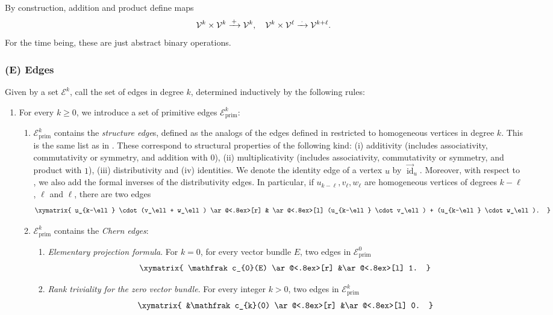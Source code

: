 \documentclass[JEP,XML,SOM,Unicode,published]{cedram}
\newcommand\To[1]{\mathchoice{\xrightarrow{\kern1pt#1\kern1pt}}{\stackrel{#1}{\longrightarrow}}{}{}}
\theoremstyle{plain}
\theoremstyle{definition}
\newcommand{\Ecal}{\mathcal E}
\newcommand{\Vcal}{\mathcal V}
\newcommand{\cfrak}{\mathfrak c}
\newcommand{\prim}{\mathrm{prim}}
\DeclareMathOperator{\id}{id}
\begin{document}
By construction, addition and product define maps
\begin{equation}\label{eq:operations-vertices}
\Vcal^{k}\times\Vcal^{k}\To{+}\Vcal^{k},\quad \Vcal^{k}\times\Vcal^{\ell}\To{\,\cdot\,}\Vcal^{k+\ell}.
\end{equation}
For the time being, these are just abstract binary operations.

\subsubsection*{\textup{(E)} Edges}
Given by a set $\Ecal^k$, call the set of edges in degree $k$, determined inductively by the following rules:
\begin{enumerate}
\item For every $k\geq 0$, we introduce a set of primitive edges $\Ecal^k_\prim$:
\begin{enumerate}
\item \label{eq:structureedges} $\Ecal^k_\prim$ contains the \emph{structure edge}s, defined as the analogs of the edges defined in \cite[Volume I, Definition 3.1.6]{Johnson-Yau} restricted to homogeneous vertices in degree $k$. This is the same list as in \cite[]{Laplaza}. These correspond to structural properties of the following kind: (i) additivity (includes associativity, commutativity or symmetry, and addition with $0$), (ii) multiplicativity (includes associativity, commutativity or symmetry, and product with $1$), (iii) distributivity and (iv) identities. We denote the identity edge of a vertex $u$ by $\overset{\to}{\id}_u$. Moreover, with respect to \loccit, we also add the formal inverses of the distributivity edges. In particular, if $u_{k-\ell}, v_{\ell}, w_{\ell}$ are homogeneous vertices of degrees $k-\ell$, $\ell$ and $\ell$, there are two edges
\begin{displaymath}
\xymatrix{
u_{k-\ell} \cdot (v_\ell + w_\ell) \ar@<.8ex>[r] & \ar@<.8ex>[l] (u_{k-\ell} \cdot v_\ell) + (u_{k-\ell} \cdot w_\ell).
}
\end{displaymath}
\item $\Ecal^k_\prim$ contains the \emph{Chern edges}:
\begin{enumerate}
\item\label{item:formal-iso-1} \emph{Elementary projection formula}. For $k=0$, for every vector bundle $E$, two edges in $\Ecal_{\prim}^0$
\begin{displaymath}
\xymatrix{
\cfrak_{0}(E) \ar@<.8ex>[r] &\ar@<.8ex>[l] 1.
}
\end{displaymath}
\item\label{item:formal-iso-3} \emph{Rank triviality for the zero vector bundle}. For every integer $k > 0$, two edges in $\Ecal^k_{\prim}$
\begin{displaymath}
\xymatrix{
&\cfrak_{k}(0) \ar@<.8ex>[r] &\ar@<.8ex>[l] 0.
}
\end{displaymath}


\end{enumerate}
\end{enumerate}
\end{enumerate}
\end{document}
